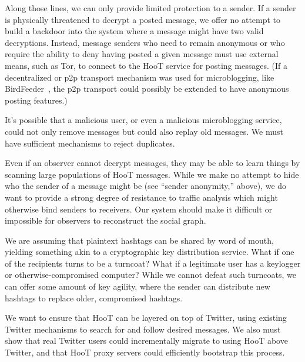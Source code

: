 \begin{description}
\item[Sender anonymity or deniability.] Along those lines, we can only provide limited protection to a sender. If a sender is physically threatened to decrypt a posted message, we offer no attempt to build a backdoor into the system where a message might have two valid decryptions. Instead, message senders who need to remain anonymous or who require the ability to deny having posted a given message must use external means, such as Tor, to connect to the HooT service for posting messages. (If a decentralized or p2p transport mechanism was used for microblogging, like BirdFeeder~\cite{sandler09}, the p2p transport could possibly be extended to have anonymous posting features.)

\item[Replay attacks.] It's possible that a malicious user, or even a malicious microblogging service, could not only remove messages but could also replay old messages. We must have sufficient mechanisms to reject duplicates.

\item[Statistical and traffic analysis.] Even if an observer cannot decrypt messages, they may be able to learn things by scanning large populations of HooT messages. While we make no attempt to hide who the sender of a message might be (see ``sender anonymity,'' above), we do want to provide a strong degree of resistance to traffic analysis which might otherwise bind senders to receivers. Our system should make it difficult or impossible for observers to reconstruct the social graph.

\item[Secret informers and coerced users.] We are assuming that plaintext hashtags can be shared by word of mouth, yielding something akin to a cryptographic key distribution service. What if one of the recipients turns to be a turncoat? What if a legitimate user has a keylogger or otherwise-compromised computer? While we cannot defeat such turncoats, we can offer some amount of key agility, where the sender can distribute new hashtags to replace older, compromised hashtags.

\item[Compatibility.] We want to ensure that HooT can be layered on top of Twitter, using existing Twitter mechanisms to search for and follow desired messages. We also must show that real Twitter users could incrementally migrate to using HooT above Twitter, and that HooT proxy servers could efficiently bootstrap this process.

\item 

\end{description}

